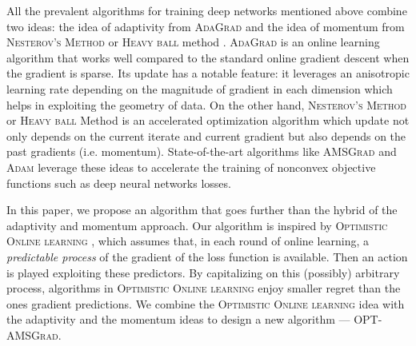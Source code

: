 \documentclass[11pt]{article}
\theoremstyle{k}
\begin{document}
All the prevalent algorithms for training deep networks mentioned above combine two ideas: the idea of adaptivity from \textsc{AdaGrad} \citep{DHS11,MS10} and the idea of momentum from \textsc{Nesterov's  Method} \citep{N04} or \textsc{Heavy ball} method \citep{P64}.
\textsc{AdaGrad} is an online learning algorithm that works well compared to the standard online gradient descent when the gradient is sparse.
Its update has a notable feature: it leverages an anisotropic learning rate depending on the magnitude of gradient in each dimension which helps in exploiting the geometry of data. 
On the other hand, \textsc{Nesterov's Method} or \textsc{Heavy ball} Method \citep{P64} is an accelerated optimization algorithm which update not only depends on the current iterate and current gradient but also depends on the past gradients (i.e. momentum). 
State-of-the-art algorithms like \textsc{AMSGrad} \citep{RKK18} and \textsc{Adam} \citep{KB15} leverage these ideas to accelerate the training of nonconvex objective functions such as deep neural networks losses.

In this paper, we propose an algorithm that goes further than the hybrid of the adaptivity and momentum approach. 
Our algorithm is inspired by \textsc{Optimistic Online learning} \citep{CJ12,rakhlin2013online,SALS15,ALLW18,mertikopoulos2018optimistic}, which assumes that, in each round of online learning, a \emph{predictable process} of the gradient of the loss function is available. 
Then an action is played exploiting these predictors. 
By capitalizing on this (possibly) arbitrary process, algorithms in \textsc{Optimistic Online learning} enjoy smaller regret than the ones gradient predictions.
We combine the \textsc{Optimistic Online learning} idea with the adaptivity and the momentum ideas to design a new algorithm --- \textsc{OPT-AMSGrad}. 
\end{document}
